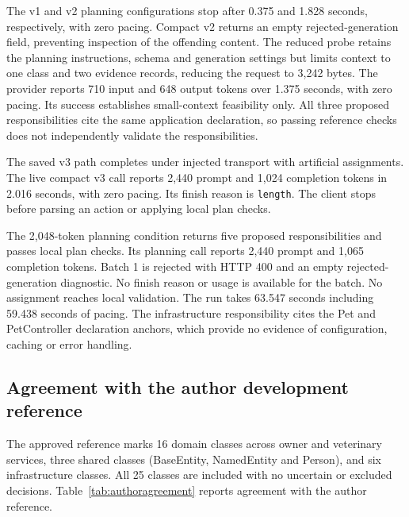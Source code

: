 The v1 and v2 planning configurations stop after 0.375 and 1.828 seconds, respectively, with zero pacing. Compact v2 returns an empty rejected-generation field, preventing inspection of the offending content. The reduced probe retains the planning instructions, schema and generation settings but limits context to one class and two evidence records, reducing the request to 3,242 bytes. The provider reports 710 input and 648 output tokens over 1.375 seconds, with zero pacing. Its success establishes small-context feasibility only. All three proposed responsibilities cite the same application declaration, so passing reference checks does not independently validate the responsibilities.

The saved v3 path completes under injected transport with artificial assignments. The live compact v3 call reports 2,440 prompt and 1,024 completion tokens in 2.016 seconds, with zero pacing. Its finish reason is \texttt{length}. The client stops before parsing an action or applying local plan checks.

The 2,048-token planning condition returns five proposed responsibilities and passes local plan checks. Its planning call reports 2,440 prompt and 1,065 completion tokens. Batch 1 is rejected with HTTP 400 and an empty rejected-generation diagnostic. No finish reason or usage is available for the batch. No assignment reaches local validation. The run takes 63.547 seconds including 59.438 seconds of pacing. The infrastructure responsibility cites the Pet and PetController declaration anchors, which provide no evidence of configuration, caching or error handling.

\subsection{Agreement with the author development reference}

The approved reference marks 16 domain classes across owner and veterinary services, three shared classes (BaseEntity, NamedEntity and Person), and six infrastructure classes. All 25 classes are included with no uncertain or excluded decisions. Table~\ref{tab:authoragreement} reports agreement with the author reference.

